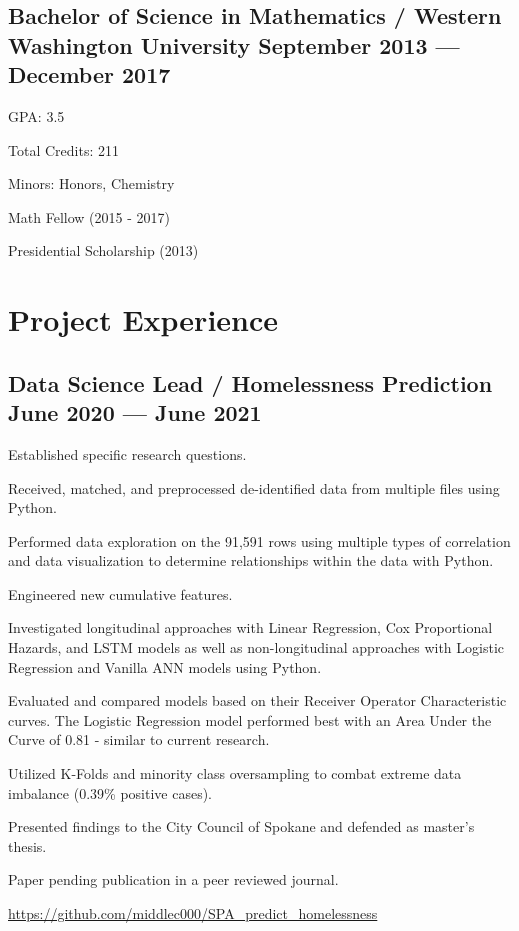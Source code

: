 \documentclass[letter,10pt]{article}
\begin{document}
\subsection{{Bachelor of Science in Mathematics / Western Washington University \hfill September 2013 --- December 2017}}
\begin{zitemize}
    \item GPA: 3.5
    \item Total Credits: 211
    \item Minors: Honors, Chemistry
    \item Math Fellow (2015 - 2017)
    \item Presidential Scholarship (2013)
\end{zitemize}

\section{Project Experience}
\subsection{{Data Science Lead / Homelessness Prediction \hfill June 2020 --- June 2021}}
\begin{zitemize}
    \item Established specific research questions.
    \item Received, matched, and preprocessed de-identified data from multiple files using Python.
    \item Performed data exploration on the 91,591 rows using multiple types of correlation and data visualization to determine relationships within the data with Python.
    \item Engineered new cumulative features.
    \item Investigated longitudinal approaches with Linear Regression, Cox Proportional Hazards, and LSTM models as well as non-longitudinal approaches with Logistic Regression and Vanilla ANN models using Python.
    \item Evaluated and compared models based on their Receiver Operator Characteristic curves. The Logistic Regression model performed best with an Area Under the Curve of 0.81 - similar to current research.
    \item Utilized K-Folds and minority class oversampling to combat extreme data imbalance (0.39\% positive cases).
    \item Presented findings to the City Council of Spokane and defended as master's thesis. 
    \item Paper pending publication in a peer reviewed journal.
    \item \url{https://github.com/middlec000/SPA_predict_homelessness}
\end{zitemize}
\end{document}
